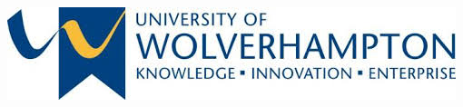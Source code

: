 \documentclass[final]{beamer}
\newlength{\onecolwid}
\begin{document}
\begin{frame}[t]
\begin{columns}[t]
\begin{column}{\onecolwid}
\includegraphics[width=0.9\linewidth]{pics/wlv-logo-more.jpeg}


\end{column} %

\end{columns} %

\end{frame} %
\end{document}
